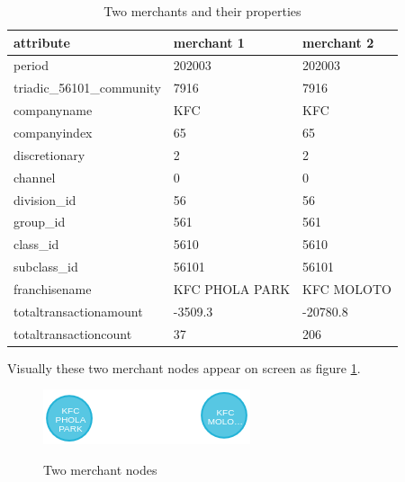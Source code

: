 \begin{center}
    \begin{table}[htb!]
        \centering
    \begin{tabular}{lll}
    \toprule
                   attribute &      merchant 1 &  merchant 2 \\
    \midrule
                      period &          202003 &      202003 \\
                 
     triadic\_56101\_community &            7916 &        7916 \\
                 companyname &             KFC &         KFC \\
                companyindex &              65 &          65 \\   
               discretionary &               2 &           2 \\
                     channel &               0 &           0 \\
                 division\_id &              56 &          56 \\
                    group\_id &             561 &         561 \\   
                    class\_id &            5610 &        5610 \\ 
                 subclass\_id &           56101 &       56101 \\                   
               franchisename &  KFC PHOLA PARK &  KFC MOLOTO \\                 
      totaltransactionamount &         -3509.3 &    -20780.8 \\                 
       totaltransactioncount &              37 &         206 \\
    \bottomrule
    \end{tabular}
        \caption{Two merchants and their properties}
        \label{tab:twomerchantproperties}
    \end{table}
\end{center}


Visually these two merchant nodes appear on screen as figure \ref{fig:twomerchantnodes}.

\begin{figure}[ht]
\caption{Two merchant nodes}
\centering
\includegraphics[width=\textwidth]{png/merchant12.png}
\label{fig:twomerchantnodes}
\end{figure}


